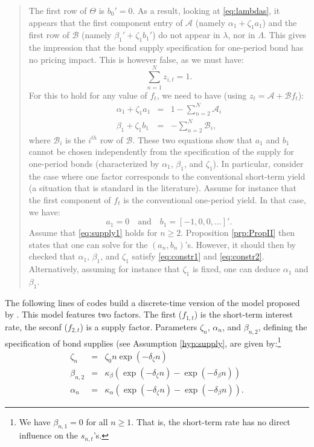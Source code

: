 \documentclass[
  12pt,
]{book}
\theoremstyle{definition}
\theoremstyle{definition}
\theoremstyle{definition}
\theoremstyle{definition}
\theoremstyle{remark}
\begin{document}
\begin{quote}
The first row of \(\Theta\) is \(b_0'=0\). As a result, looking at \eqref{eq:lambdas}, it appears that the first component entry of \(\mathcal{A}\) (namely \(\alpha_1 + \zeta_1 a_1\)) and the first row of \(\mathcal{B}\) (namely \(\beta_1' + \zeta_1 b_1'\)) do not appear in \(\lambda\), nor in \(\Lambda\). This gives the impression that the bond supply specification for one-period bond has no pricing impact. This is however false, as we must have:
\[
\sum_{n=1}^N z_{i,t} = 1.
\]
For this to hold for any value of \(f_t\), we need to have (using \(z_t = \mathcal{A} + \mathcal{B}f_t\)):
\begin{eqnarray}
\alpha_1 + \zeta_1 a_1 &=& 1 - \sum_{n=2}^N\mathcal{A}_i \label{eq:constr1}\\
\beta_1 + \zeta_1 b_1&=&  - \sum_{n=2}^N\mathcal{B}_i,\label{eq:constr2}
\end{eqnarray}
where \(\mathcal{B}_i\) is the \(i^{th}\) row of \(\mathcal{B}\). These two equations show that \(a_1\) and \(b_1\) cannot be chosen independently from the specification of the supply for one-period bonds (characterized by \(\alpha_1\), \(\beta_1\), and \(\zeta_1\)).
In particular, consider the case where one factor corresponds to the conventional short-term yield (a situation that is standard in the literature). Assume for instance that the first component of \(f_t\) is the conventional one-period yield. In that case, we have:
\[
a_1 = 0 \quad \mbox{and}\quad b_1 = [-1,0,0,\dots]'.
\]
Assume that \eqref{eq:supply1} holds for \(n \ge 2\). Proposition \ref{prp:PropII} then states that one can solve for the \((a_n,b_n)\)'s. However, it should then by checked that \(\alpha_1\), \(\beta_1\), and \(\zeta_1\) satisfy \eqref{eq:constr1} and \eqref{eq:constr2}. Alternatively, assuming for instance that \(\zeta_1\) is fixed, one can deduce \(\alpha_1\) and \(\beta_1\).
\end{quote}

The following lines of codes build a discrete-time version of the model proposed by \citet{Vayanos_Vila_2021}. This model features two factors. The first (\(f_{1,t}\)) is the short-term interest rate, the seconf (\(f_{2,t}\)) is a supply factor. Parameters \(\zeta_n\), \(\alpha_n\), and \(\beta_{n,2}\), defining the specification of bond supplies (see Assumption \ref{hyp:supply}, are given by:\footnote{We have \(\beta_{n,1}=0\) for all \(n \ge 1\). That is, the short-term rate has no direct influence on the \(s_{n,t}\)'s.}
\begin{eqnarray}
\zeta_n &=& \zeta_0 n \exp(-\delta_\zeta n) \\
\beta_{n,2} &=& \kappa_{\beta} ( \exp(-\delta_\zeta n) - \exp(-\delta_{\beta} n) ) \\
\alpha_n &=& \kappa_\alpha ( \exp(-\delta_\zeta n) - \exp(-\delta_\beta n) ).
\end{eqnarray}
\end{document}
